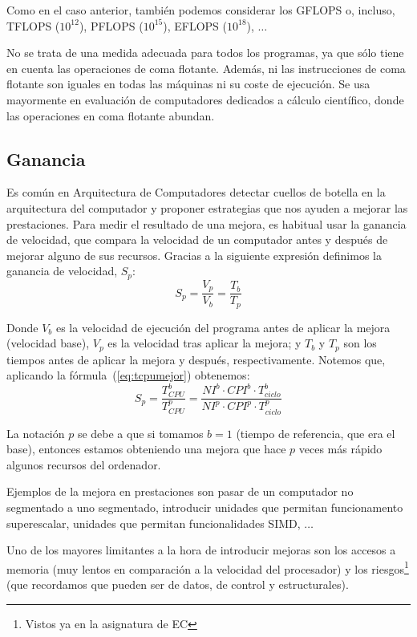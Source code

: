 Como en el caso anterior, también podemos considerar los GFLOPS o, incluso, TFLOPS ($10^{12}$), PFLOPS ($10^{15}$), EFLOPS ($10^{18}$), $\ldots$ 

No se trata de una medida adecuada para todos los programas, ya que sólo tiene en cuenta las operaciones de coma flotante. Además, ni las instrucciones de coma flotante son iguales en todas las máquinas ni su coste de ejecución. Se usa mayormente en evaluación de computadores dedicados a cálculo científico, donde las operaciones en coma flotante abundan.

\subsection{Ganancia}
Es común en Arquitectura de Computadores detectar cuellos de botella en la arquitectura del computador y proponer estrategias que nos ayuden a mejorar las prestaciones. Para medir el resultado de una mejora, es habitual usar la ganancia de velocidad, que compara la velocidad de un computador antes y después de mejorar alguno de sus recursos. Gracias a la siguiente expresión definimos la ganancia de velocidad, $S_p$:
\begin{equation}
    S_p = \dfrac{V_p}{V_b} = \dfrac{T_b}{T_p}
\end{equation}

Donde $V_b$ es la velocidad de ejecución del programa antes de aplicar la mejora (velocidad base), $V_p$ es la velocidad tras aplicar la mejora; y $T_b$ y $T_p$ son los tiempos antes de aplicar la mejora y después, respectivamente. Notemos que, aplicando la fórmula~(\ref{eq:tcpumejor}) obtenemos:
\begin{equation}
    S_p = \dfrac{T^b_{CPU}}{T^p_{CPU}} = \dfrac{NI^b \cdot CPI^b \cdot T^b_{ciclo}}{NI^p \cdot CPI^p \cdot T^p_{ciclo}}
\end{equation}

La notación $p$ se debe a que si tomamos $b = 1$ (tiempo de referencia, que era el base), entonces estamos obteniendo una mejora que hace $p$ veces más rápido algunos recursos del ordenador.

Ejemplos de la mejora en prestaciones son pasar de un computador no segmentado a uno segmentado, introducir unidades que permitan funcionamento superescalar, unidades que permitan funcionalidades SIMD, $\ldots$

Uno de los mayores limitantes a la hora de introducir mejoras son los accesos a memoria (muy lentos en comparación a la velocidad del procesador) y los riesgos\footnote{Vistos ya en la asignatura de EC} (que recordamos que pueden ser de datos, de control y estructurales).

